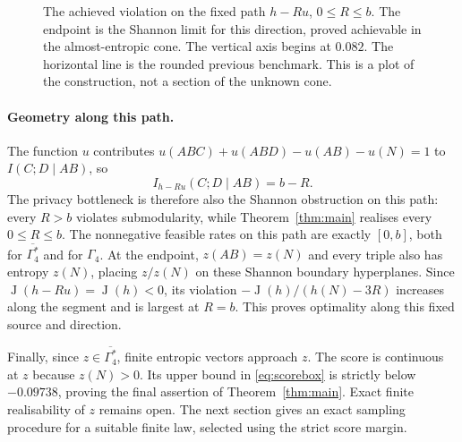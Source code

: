 \documentclass[a4paper,11pt]{article}
\newcommand{\AEcone}{\overline{\Gamma_4^{*}}}
\newcommand{\Ing}{\operatorname{J}}
\begin{document}
\begin{figure}[ht]
\centering

\caption{The achieved violation on the fixed path $h-Ru$, $0\le R\le b$.
The endpoint is the Shannon limit for this direction, proved achievable
in the almost-entropic cone. The vertical axis begins at $0.082$. The horizontal line is the rounded
previous benchmark. This is a plot of the construction, not a section of the unknown cone.}
\label{fig:path}
\end{figure}

\paragraph{Geometry along this path.}
The function $u$ contributes
$u(ABC)+u(ABD)-u(AB)-u(N)=1$ to $I(C;D\mid AB)$, so
\[
 I_{h-Ru}(C;D\mid AB)=b-R.
\]
The privacy bottleneck is therefore also the Shannon obstruction on this
path: every $R>b$ violates submodularity, while Theorem~\ref{thm:main}
realises every $0\le R\le b$. The nonnegative feasible rates on this
path are exactly $[0,b]$, both for $\AEcone$ and for $\Gamma_4$.
At the endpoint, $z(AB)=z(N)$ and every triple also has entropy $z(N)$,
placing $z/z(N)$ on these Shannon boundary hyperplanes.
Since $\Ing(h-Ru)=\Ing(h)<0$, its violation
$-\Ing(h)/(h(N)-3R)$ increases along the segment and is largest at $R=b$.
This proves optimality along this fixed source and direction.

Finally, since $z\in\AEcone$, finite entropic vectors approach $z$.
The score is continuous at $z$ because $z(N)>0$. Its upper bound in
\eqref{eq:scorebox} is strictly below $-0.09738$, proving the final
assertion of Theorem~\ref{thm:main}.
Exact finite realisability of $z$ remains open.
The next section gives an exact sampling procedure for
a suitable finite law, selected using the strict score margin.





\appendix



\end{document}
